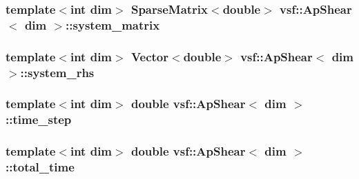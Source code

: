 \hypertarget{classvsf_1_1ApShear_a8735861f0a5530262407cd52b7a1b386}{
\subsubsection[{system\-\_\-matrix}]{\setlength{\rightskip}{0pt plus 5cm}template$<$int dim$>$ Sparse\-Matrix$<$double$>$ {\bf vsf\-::\-Ap\-Shear}$<$ dim $>$\-::system\-\_\-matrix\hspace{0.3cm}{\ttfamily [private]}}}\label{classvsf_1_1ApShear_a8735861f0a5530262407cd52b7a1b386}
\hypertarget{classvsf_1_1ApShear_ab1046cf38cb6535dd0ab78793bccf6a1}{
\subsubsection[{system\-\_\-rhs}]{\setlength{\rightskip}{0pt plus 5cm}template$<$int dim$>$ Vector$<$double$>$ {\bf vsf\-::\-Ap\-Shear}$<$ dim $>$\-::system\-\_\-rhs\hspace{0.3cm}{\ttfamily [private]}}}\label{classvsf_1_1ApShear_ab1046cf38cb6535dd0ab78793bccf6a1}
\hypertarget{classvsf_1_1ApShear_ab11c93d8c80fc10976c8fb91a733cf92}{
\subsubsection[{time\-\_\-step}]{\setlength{\rightskip}{0pt plus 5cm}template$<$int dim$>$ double {\bf vsf\-::\-Ap\-Shear}$<$ dim $>$\-::time\-\_\-step\hspace{0.3cm}{\ttfamily [private]}}}\label{classvsf_1_1ApShear_ab11c93d8c80fc10976c8fb91a733cf92}
\hypertarget{classvsf_1_1ApShear_ab4bd5313e37b8819910d35aaae0a2373}{
\subsubsection[{total\-\_\-time}]{\setlength{\rightskip}{0pt plus 5cm}template$<$int dim$>$ double {\bf vsf\-::\-Ap\-Shear}$<$ dim $>$\-::total\-\_\-time\hspace{0.3cm}{\ttfamily [private]}}}\label{classvsf_1_1ApShear_ab4bd5313e37b8819910d35aaae0a2373}
